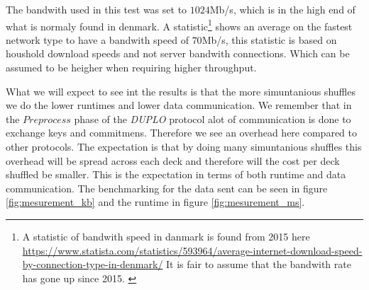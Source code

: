 \documentclass[twoside,11pt,openright]{report}
\newcommand{\DUPLO}{\textit{DUPLO} }
\begin{document}
The bandwith used in this test was set to $1024$Mb/s, which is in the high end of what is normaly found in denmark. A statistic\footnote{A statistic of bandwith speed in danmark is found from 2015 here \linebreak \url{https://www.statista.com/statistics/593964/average-internet-download-speed-by-connection-type-in-denmark/} \linebreak It is fair to assume that the bandwith rate has gone up since 2015. \label{footnote:bandwith_stats}} shows an average on the fastest network type to have a bandwith speed of $70$Mb/s, this statistic is based on houshold download speeds and not server bandwith connections. Which can be assumed to be heigher when requiring higher throughput.

\bigskip

What we will expect to see int the results is that the more simuntanious shuffles we do the lower runtimes and lower data communication. We remember that in the $Preprocess$ phase of the \DUPLO protocol alot of communication is done to exchange keys and commitmens. Therefore we see an overhead here compared to other protocols. The expectation is that by doing many simuntanious shuffles this overhead will be spread across each deck and therefore will the cost per deck shuffled be smaller. This is the expectation in terms of both runtime and data communication. The benchmarking for the data sent can be seen in figure \ref{fig:mesurement_kb} and the runtime in figure \ref{fig:mesurement_ms}.
\end{document}
